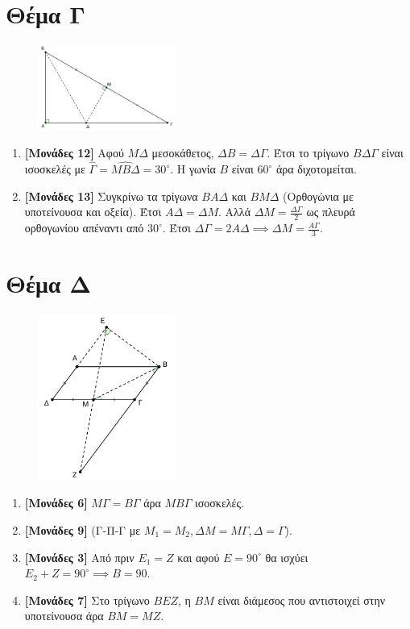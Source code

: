\documentclass[12pt]{article}
\begin{document}
\section*{Θέμα Γ}
  \noindent
  \begin{figure}
    \centering
    \vspace{-20pt}
    \includegraphics[width=0.4\textwidth]{2017AGeo3}
  \end{figure}
    \begin{enumerate}
    \item \textbf{[Μονάδες 12]} Αφού $ΜΔ$ μεσοκάθετος, $ΔΒ=ΔΓ$. Έτσι το τρίγωνο $ΒΔΓ$ είναι ισοσκελές με $\hat{Γ}=\widehat{ΜΒΔ}=30^{\circ}$. Η γωνία $Β$ είναι $60^{\circ}$ άρα διχοτομείται.
    \item \textbf{[Μονάδες 13]} Συγκρίνω τα τρίγωνα $ΒΑΔ$ και $ΒΜΔ$ (Ορθογώνια με υποτείνουσα και οξεία). Έτσι $ΑΔ=ΔΜ$. Αλλά $ΔΜ=\frac{ΔΓ}{2}$ ως πλευρά ορθογωνίου απέναντι από $30^{\circ}$. Έτσι $ΔΓ=2ΑΔ \implies ΔΜ=\frac{ΑΓ}{3}$.
  \end{enumerate}

\section*{Θέμα Δ}
  \noindent
  \begin{figure}
    \centering
    \vspace{-50pt}
    \includegraphics[width=0.4\textwidth]{2017AGeo4}
  \end{figure}
  \begin{enumerate}
    \item \textbf{[Μονάδες 6]}  $ΜΓ=ΒΓ$ άρα $ΜΒΓ$ ισοσκελές.
    \item \textbf{[Μονάδες 9]}  (Γ-Π-Γ με $Μ_1=Μ_2,ΔΜ=ΜΓ,Δ=Γ$).
    \item \textbf{[Μονάδες 3]}  Από πριν $Ε_1=Ζ$ και αφού $Ε=90^{\circ}$ θα ισχύει $E_2+Z=90^{\circ} \implies Β=90$.
    \item \textbf{[Μονάδες 7]}  Στο τρίγωνο $ΒΕΖ$, η $ΒΜ$ είναι διάμεσος που αντιστοιχεί στην υποτείνουσα άρα $ΒΜ=ΜΖ$.
  \end{enumerate}
\end{document}
